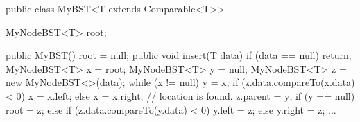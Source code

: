 public class MyBST<T extends Comparable<T>> {
	MyNodeBST<T> root;

	public MyBST() {
		root = null;
	}
	public void insert(T data) {
		if (data == null) {
			return;
		}
		MyNodeBST<T> x = root;
		MyNodeBST<T> y = null;
		MyNodeBST<T> z = new MyNodeBST<>(data);
		while (x != null) {
			y = x;
			if (z.data.compareTo(x.data) < 0) {
				x = x.left;
			} else {
				x = x.right;
			}
		}
		// location is found.
		z.parent = y;
		if (y == null) {
			root = z;
		} else if (z.data.compareTo(y.data) < 0) {
			y.left = z;
		} else {
			y.right = z;
		}
	}
	...
}
